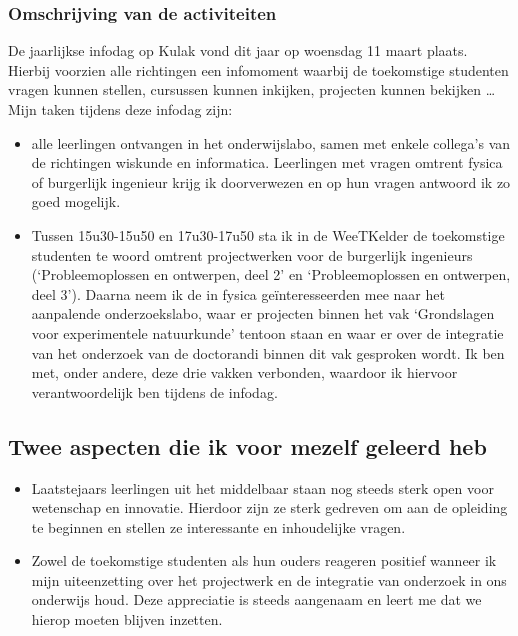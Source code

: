 \documentclass[a4paper,12pt,twoside]{article}%
\begin{document}
	\subsubsection{Omschrijving van de activiteiten}
	De jaarlijkse infodag op Kulak vond dit jaar op woensdag 11 maart plaats. Hierbij voorzien alle richtingen een infomoment waarbij de toekomstige studenten vragen kunnen stellen, cursussen kunnen inkijken, projecten kunnen bekijken \ldots Mijn taken tijdens deze infodag zijn:
	\begin{itemize}
		\item alle leerlingen ontvangen in het onderwijslabo, samen met enkele collega's van de richtingen wiskunde en informatica. Leerlingen met vragen omtrent fysica of burgerlijk ingenieur krijg ik doorverwezen en op hun vragen antwoord ik zo goed mogelijk.
		\item Tussen 15u30-15u50 en 17u30-17u50 sta ik in de WeeTKelder de toekomstige studenten te woord omtrent  projectwerken voor de burgerlijk ingenieurs (`Probleemoplossen en ontwerpen, deel 2' en `Probleemoplossen en ontwerpen, deel 3'). Daarna neem ik de in fysica geïnteresseerden mee naar het aanpalende onderzoekslabo, waar er projecten binnen het vak `Grondslagen voor experimentele natuurkunde' tentoon staan en waar er over de integratie van het onderzoek van de doctorandi binnen dit vak gesproken wordt. Ik ben met, onder andere, deze drie vakken verbonden, waardoor ik hiervoor verantwoordelijk ben tijdens de infodag.
	\end{itemize}
	
	\subsection{Twee aspecten die ik voor mezelf geleerd heb}
	\begin{itemize}
		\item Laatstejaars leerlingen uit het middelbaar staan nog steeds sterk open voor wetenschap en innovatie. Hierdoor zijn ze sterk gedreven om aan de opleiding te beginnen en stellen ze interessante en inhoudelijke vragen.
		\item Zowel de toekomstige studenten als hun ouders reageren positief wanneer ik mijn uiteenzetting over het projectwerk en de integratie van onderzoek in ons onderwijs houd. Deze appreciatie is steeds aangenaam en leert me dat we hierop moeten blijven inzetten. 
	\end{itemize}
	
	
\end{document}
